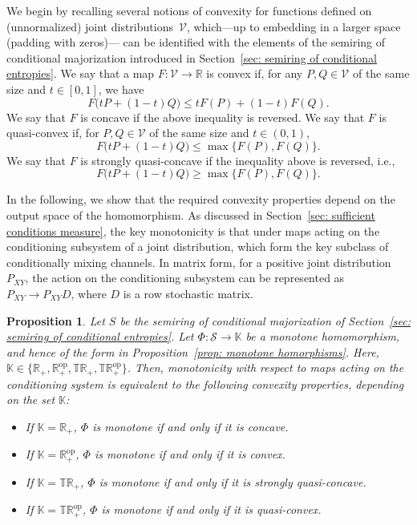 \documentclass[aps,pra,11pt,onecolumn,nofootinbib,tightenlines]{revtex4-2}
\newtheorem{proposition}[theorem]{Proposition}
\theoremstyle{definition}
\newcommand{\cS}{\mathcal{S}}
\newcommand{\V}{\mathcal{V}}
\newcommand{\mb}[1]{\mathbb{#1}}
\begin{document}
We begin by recalling several notions of convexity for functions defined on
(unnormalized) joint distributions~$\mathcal V$, which—up to embedding in a larger space (padding with zeros)—
can be identified with the elements of the semiring of conditional majorization
introduced in Section~\ref{sec: semiring of conditional entropies}.
 We say that a map $F:\V\to\mb R$ is convex if, for any $P,Q\in\V$ of the same size and $t\in[0,1]$, we have
\begin{equation}
F\big(tP+(1-t)Q\big)\leq tF(P)+(1-t)F(Q).
\end{equation}
We say that $F$ is concave if the above inequality is reversed. We say that $F$ is quasi-convex if, for $P,Q\in\V$ of the same size and $t\in(0,1)$,
\begin{equation}
F\big(tP+(1-t)Q\big)\leq\max\{F(P),F(Q)\}.
\end{equation}
We say that $F$ is strongly quasi-concave if the inequality above is reversed, i.e.,
\begin{equation}
\label{eq: def strongly quasi-conc}
    F\big(tP+(1-t)Q\big)\geq\max\{F(P),F(Q)\}.
\end{equation}

 In the following, we show that the required convexity properties depend on the output space of the homomorphism. As discussed in Section~\ref{sec: sufficient conditions measure}, the key monotonicity is that under maps acting on the conditioning subsystem of a joint distribution, which form the key subclass of conditionally mixing channels. In matrix form, for a positive joint distribution $P_{XY}$, the action on the conditioning subsystem can be represented as $ P_{XY}\rightarrow P_{XY} D$, where $D$ is a row stochastic matrix.

\begin{proposition}\label{prop:convconc}
Let $S$ be the semiring of conditional majorization of Section~\ref{sec: semiring of conditional entropies}. Let
$\Phi: \cS \to \mathbb{K}$ be a monotone homomorphism, and hence of the form in Proposition~\eqref{prop: monotone homorphisms}. Here, $\mathbb{K} \in \{\mathbb{R}_+,  \mathbb{R}_+^{\mathrm{op}},\mathbb{TR}_+,\mathbb{TR}_+^{\mathrm{op}}\}$. Then, monotonicity with respect to maps acting on the conditioning system is equivalent to the following convexity properties, depending on the set $\mathbb{K}$:
\begin{itemize}[itemsep=0pt, topsep=5pt]
\item If $\mathbb{K} =\mathbb{R}_+$, $\Phi$ is monotone if and only if it is concave.
\item If $ \mathbb{K}= \mathbb{R}_+^{\mathrm{op}}$, $\Phi$ is monotone if and only if it is convex.
\item If $ \mathbb{K}=\mathbb{TR}_+$, $\Phi$ is monotone if and only if it is strongly quasi-concave.
\item If $ \mathbb{K}=\mathbb{TR}_+^{\mathrm{op}}$, $\Phi$ is monotone if and only if it is quasi-convex.
\end{itemize}
\end{proposition}
\end{document}
